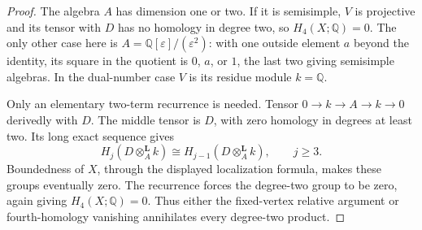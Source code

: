 \begin{proof}
The algebra $A$ has dimension one or two.  If it is
semisimple, $V$ is projective and its tensor with $D$
has no homology in degree two, so $H_4(X;\mathbb Q)=0$.
The only other case here is
$A=\mathbb Q[\varepsilon]/(\varepsilon^2)$: with one
outside element $a$ beyond the identity, its square
in the quotient is $0$, $a$, or $1$, the last two
giving semisimple algebras.  In the dual-number case
$V$ is its residue module $k=\mathbb Q$.

Only an elementary two-term recurrence is needed.
Tensor $0\to k\to A\to k\to0$ derivedly with $D$.
The middle tensor is $D$, with zero homology in
degrees at least two.  Its long exact sequence gives
\[
 H_j(D\otimes_A^{\mathbf L}k)
  \cong H_{j-1}(D\otimes_A^{\mathbf L}k),\qquad j\geq3.
\]
Boundedness of $X$, through the displayed localization
formula, makes these groups eventually zero.  The
recurrence forces the degree-two group to be zero,
again giving $H_4(X;\mathbb Q)=0$.  Thus either the
fixed-vertex relative argument or fourth-homology
vanishing annihilates every degree-two product.
\end{proof}

